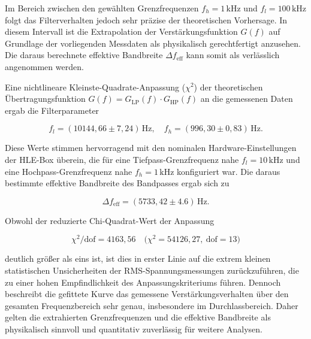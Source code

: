 Im Bereich zwischen den gewählten Grenzfrequenzen $f_h = 1\,\mathrm{kHz}$ und $f_l = 100\,\mathrm{kHz}$ folgt das Filterverhalten jedoch sehr präzise der theoretischen Vorhersage. 
In diesem Intervall ist die Extrapolation der Verstärkungsfunktion $G(f)$ auf Grundlage der vorliegenden Messdaten als physikalisch gerechtfertigt anzusehen. 
Die daraus berechnete effektive Bandbreite $\Delta f_{\mathrm{eff}}$ kann somit als verlässlich angenommen werden.

Eine nichtlineare Kleinste-Quadrate-Anpassung ($\chi^2$) der theoretischen Übertragungsfunktion $G(f)=G_{\mathrm{LP}}(f)\cdot G_{\mathrm{HP}}(f)$ an die gemessenen Daten ergab die Filterparameter

\begin{equation*}
  f_l = (10144{,}66 \pm 7{,}24)\,\mathrm{Hz}, 
  \quad
  f_h = (996{,}30 \pm 0{,}83)\,\mathrm{Hz}.
\end{equation*}

Diese Werte stimmen hervorragend mit den nominalen Hardware-Einstellungen der HLE-Box überein, die für eine Tiefpass-Grenzfrequenz nahe $f_l = 10\,\mathrm{kHz}$ und eine Hochpass-Grenzfrequenz nahe $f_h = 1\,\mathrm{kHz}$ konfiguriert war. 
Die daraus bestimmte effektive Bandbreite des Bandpasses ergab sich zu

\begin{equation*}
  \Delta f_{\mathrm{eff}} = (5733{,}42 \pm 4.6)\,\mathrm{Hz}.
\end{equation*}

Obwohl der reduzierte Chi-Quadrat-Wert der Anpassung

\begin{equation*}
  \chi^2/\mathrm{dof} = 4163{,}56
  \quad
  \bigl(\chi^2 = 54126{,}27,\ \mathrm{dof} = 13\bigr)
\end{equation*}

deutlich größer als eins ist, ist dies in erster Linie auf die extrem kleinen statistischen Unsicherheiten der RMS-Spannungsmessungen zurückzuführen, die zu einer hohen Empfindlichkeit des Anpassungskriteriums führen. 
Dennoch beschreibt die gefittete Kurve das gemessene Verstärkungsverhalten über den gesamten Frequenzbereich sehr genau, insbesondere im Durchlassbereich. 
Daher gelten die extrahierten Grenzfrequenzen und die effektive Bandbreite als physikalisch sinnvoll und quantitativ zuverlässig für weitere Analysen.
